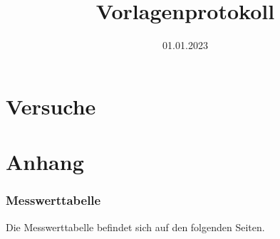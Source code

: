 
\usepackage{subfiles}

\title{Vorlagenprotokoll}
\date{01.01.2023}


\maketitle


\newpage

\newpage
\part{Versuche}

\newpage

\newpage

\newpage

\newpage
\part{Anhang}
\printbibliography[heading=bibnumbered,title=Referenzen und Literatur]
\newpage
\section{Messwerttabelle}
Die Messwerttabelle befindet sich auf den folgenden Seiten.

